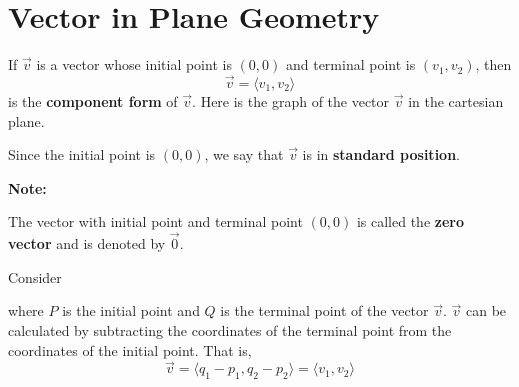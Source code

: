 \chapter{Vector in Plane Geometry}

If $\vec{v}$ is a vector whose initial point is $(0, 0)$ and terminal point is
$(v_1, v_2)$, then \[\vec{v} = \langle v_1, v_2 \rangle\] is the \textbf{component form} of $\vec{v}$. Here is the graph of the vector
$\vec{v}$ in the cartesian plane.
\begin{center}
\end{center}
Since the initial point is $(0, 0)$, we say that $\vec{v}$ is in \textbf{standard position}.\\

\begin{framed}
    \noindent\textbf{Note: }

    \noindent The vector with initial point and terminal point $(0, 0)$ is called the
    \textbf{zero vector} and is denoted by $\vec{0}$.
\end{framed}

\newpage
\noindent Consider
\begin{center}
\end{center}
where $P$ is the initial point and $Q$ is the terminal point of the vector $\vec{v}$. $\vec{v}$ can be calculated by subtracting the coordinates of the terminal point from the coordinates of the initial point. That is, \[\vec{v} = \langle q_1 - p_1, q_2 - p_2 \rangle = \langle v_1, v_2 \rangle\]

